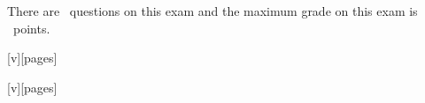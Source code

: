 \documentclass[11pt]{exam}
\begin{document}
\begin{coverpages}
 \vspace{0.1 in}

 \noindent There are \numquestions\ questions on this exam and the maximum grade
on this exam is \numpoints\ points.

 \vspace{0.2 in}

	\begin{multicols*}{2}
		\begin{center}			
		[v][pages] 
		\end{center}
		
		\begin{center}			
		[v][pages] 
		\end{center}
	\end{multicols*}
	 

\end{coverpages}

\begin{questions}






\newcommand{\Coding}[1]{#1}

\newpage
{} 
\XP{}
\newpage
\SQA{}
\Advocacy{}
\newpage
\Mistakes{}
\newpage
\OOMetrics{}
\newpage
\Reuse{}
\Testing{}
\newpage
\Coding{\TestingXiaoyu{}}
\ReverseEngineering{}
\CodeSmells{}
\newpage
{} 
\Coding{\IPO{}}
\newpage
\Jenkins{}
\VersionControl{}
\newpage
\Documentation{}
\Patterns{}
\newpage
\Coding{\Iterators{}}
\Coding{\Visitor{}}
\end{questions}
\end{document}

